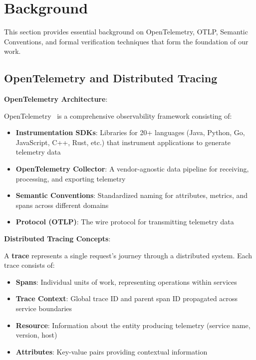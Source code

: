 
\section{Background}
\label{sec:background}

This section provides essential background on OpenTelemetry, OTLP, Semantic Conventions, and formal verification techniques that form the foundation of our work.

\subsection{OpenTelemetry and Distributed Tracing}
\label{sec:opentelemetry}

\textbf{OpenTelemetry Architecture}:

OpenTelemetry~\cite{opentelemetry2023} is a comprehensive observability framework consisting of:

\begin{itemize}
\item \textbf{Instrumentation SDKs}: Libraries for 20+ languages (Java, Python, Go, JavaScript, C++, Rust, etc.) that instrument applications to generate telemetry data
\item \textbf{OpenTelemetry Collector}: A vendor-agnostic data pipeline for receiving, processing, and exporting telemetry
\item \textbf{Semantic Conventions}: Standardized naming for attributes, metrics, and spans across different domains
\item \textbf{Protocol (OTLP)}: The wire protocol for transmitting telemetry data
\end{itemize}

\textbf{Distributed Tracing Concepts}:

A \textbf{trace} represents a single request's journey through a distributed system. Each trace consists of:

\begin{itemize}
\item \textbf{Spans}: Individual units of work, representing operations within services
\item \textbf{Trace Context}: Global trace ID and parent span ID propagated across service boundaries
\item \textbf{Resource}: Information about the entity producing telemetry (service name, version, host)
\item \textbf{Attributes}: Key-value pairs providing contextual information
\end{itemize}

